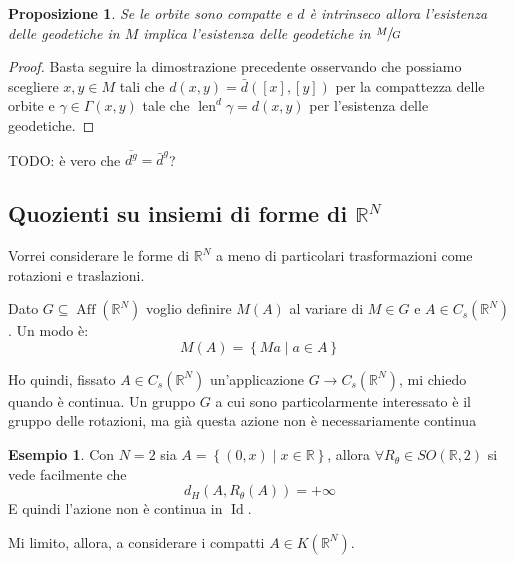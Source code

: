 \documentclass[a4paper,10pt]{article}
\newcounter{counter1}
\theoremstyle{plain}
\newtheorem{mypro}[counter1]{Proposizione}
\theoremstyle{definition}
\newtheorem{myes}[counter1]{Esempio}
\theoremstyle{remark}
\newcommand{\obar}[1]{\overline{#1}}
\newcommand{\set}[1]{\left\{#1\right\}}
\newcommand{\pa}[1]{\left(#1\right)}
\newcommand{\bra}[1]{\left[#1\right]}
\DeclareMathOperator{\id}{Id}
\DeclareMathOperator{\len}{len}
\DeclareMathOperator{\aff}{Aff}
\begin{document}
\begin{mypro}
  Se le orbite sono compatte e $d$ è intrinseco allora l'esistenza
  delle geodetiche in $M$ implica l'esistenza delle geodetiche in
  $\sfrac{M}{G}$
\end{mypro}
\begin{proof}
  Basta seguire la dimostrazione precedente osservando che possiamo
  scegliere $x,y \in M$ tali che $d(x,y) = \bar d (\bra{x}, \bra{y})$
  per la compattezza delle orbite e $\gamma \in \Gamma\pa{x,y}$ tale che
  $\len ^d \gamma = d(x,y)$ per l'esistenza delle geodetiche.
\end{proof}

TODO: è vero che $\obar{d^g} = \bar d ^g$?

\subsection{Quozienti su insiemi di forme di $\mathbb{R}^N$}

Vorrei considerare le forme di $\mathbb{R}^N$ a meno di particolari
trasformazioni come rotazioni e traslazioni.

Dato $G \subseteq \aff(\mathbb{R}^N)$ voglio definire $M(A)$ al
variare di $M \in G$ e $A \in C_s(\mathbb{R}^N)$. Un modo è:
\[ M(A) = \set{ Ma \mid a \in A } \]

Ho quindi, fissato $A \in C_s(\mathbb{R}^N)$ un'applicazione $G \to
C_s(\mathbb{R}^N)$, mi chiedo quando è continua. Un gruppo $G$ a cui
sono particolarmente interessato è il gruppo delle rotazioni, ma già
questa azione non è necessariamente continua
\begin{myes}
  Con $N = 2$ sia $A = \set{(0,x) \mid x \in \mathbb{R}}$, allora
  $\forall R_\theta \in SO(\mathbb{R},2)$ si vede facilmente che
  \[ d_H(A, R_\theta (A)) = + \infty \] 
  E quindi l'azione non è continua in $\id$.
\end{myes}

Mi limito, allora, a considerare i compatti $A \in K(\mathbb{R}^N)$.
\end{document}
